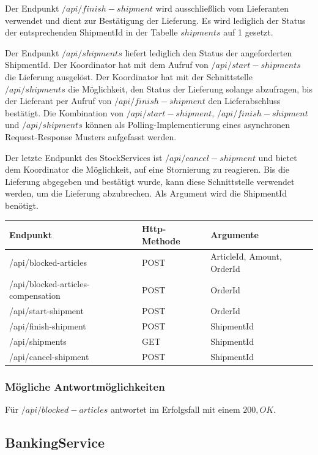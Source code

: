 Der Endpunkt $/api/finish-shipment$ wird ausschließlich vom Lieferanten verwendet und dient zur Bestätigung der Lieferung. Es wird lediglich der Status der entsprechenden ShipmentId in der Tabelle $shipments$ auf 1 gesetzt.

Der Endpunkt $/api/shipments$ liefert lediglich den Status der angeforderten ShipmentId. Der Koordinator hat mit dem Aufruf von $/api/start-shipments$ die Lieferung ausgelöst. Der Koordinator hat mit der Schnittstelle $/api/shipments$ die Möglichkeit, den Status der Lieferung solange abzufragen, bis der Lieferant per Aufruf von $/api/finish-shipment$ den Lieferabschluss bestätigt. Die Kombination von $/api/start-shipment$, $/api/finish-shipment$ und $/api/shipments$ können als Polling-Implementierung eines asynchronen Request-Response Musters aufgefasst werden. 

Der letzte Endpunkt des StockServices ist $/api/cancel-shipment$ und bietet dem Koordinator die Möglichkeit, auf eine Stornierung zu reagieren. Bis die Lieferung abgegeben und bestätigt wurde, kann diese Schnittstelle verwendet werden, um die Lieferung abzubrechen. Als Argument wird die ShipmentId benötigt.

\begin{center}
	\begin{tabular}[h]{|p{4.5cm}|p{1.5cm}|p{5.5cm}|}
		\hline
		Endpunkt & Http-Methode & Argumente \\ \hline
		/api/blocked-articles & POST & ArticleId, Amount, OrderId\\ \hline
		/api/blocked-articles-compensation & POST & OrderId \\ \hline
		/api/start-shipment & POST & OrderId \\ \hline
		/api/finish-shipment & POST & ShipmentId \\ \hline
		/api/shipments & GET & ShipmentId \\ \hline
		/api/cancel-shipment & POST & ShipmentId \\ \hline
	\end{tabular}
\end{center}
\FloatBarrier

\subsubsection{Mögliche Antwortmöglichkeiten}
Für $/api/blocked-articles$ antwortet im Erfolgsfall mit einem $200, OK$. 

\subsection{BankingService}
